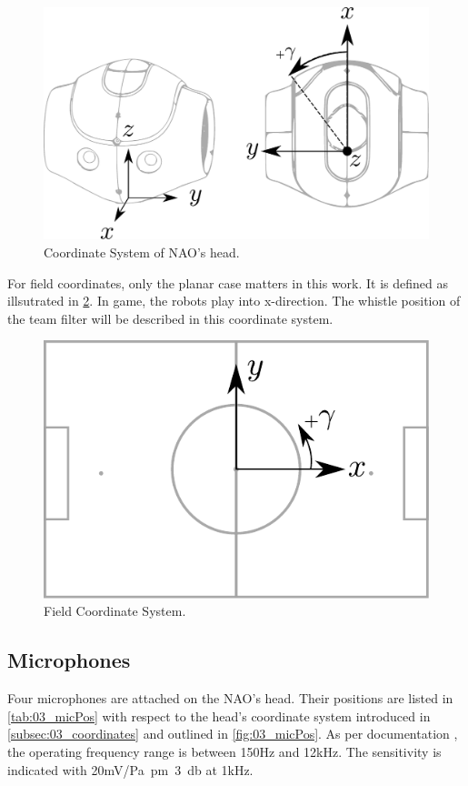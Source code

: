 \begin{figure}[ht]
      \centering
      \includegraphics[width=0.60\columnwidth]{figures/nao_coor_both}
      \caption{Coordinate System of NAO's head.}
      \label{fig:03_naoCoordinate}
\end{figure}

For field coordinates, only the planar case matters in this work.
It is defined as illsutrated in \cref{fig:03_fieldCoordinates}.
In game, the robots play into x-direction.
The whistle position of the team filter will be described
in this coordinate system.
\begin{figure}[ht]
      \centering
      \includegraphics[width=0.50\columnwidth]{figures/field}
      \caption{Field Coordinate System.}
      \label{fig:03_fieldCoordinates}
\end{figure}

\subsection{Microphones}
\label{subsec:03_microphones}

Four microphones are attached on the NAO's head.
Their positions are listed in \cref{tab:03_micPos} with respect
to the head's coordinate system introduced in \cref{subsec:03_coordinates}
\cite{v6_docu} and outlined in \cref{fig:03_micPos}.
As per documentation \cite{nao_docu}, the operating frequency range
is between 150\si{\hertz} and 12\si{\kilo\hertz}.
The sensitivity is indicated with 20\si{\milli\volt/\pascal\pm3\decibel} at
1\si{\kilo\hertz}.

